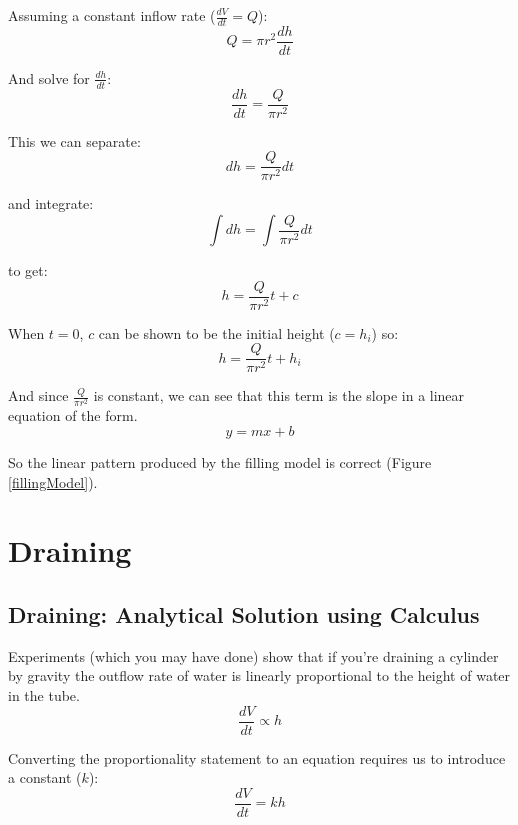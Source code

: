 \documentclass[11pt,fleqn]{article}
\begin{document}
	Assuming a constant inflow rate ($\frac{dV}{dt} = Q$):
	\begin{equation}
		Q = \pi r^2 \frac{dh}{dt} 
	\end{equation}

	And solve for $\frac{dh}{dt}$:
	\begin{equation}
		\frac{dh}{dt} = \frac{Q}{\pi r^2 }
	\end{equation}

	This we can separate:
	\begin{equation}
		dh = \frac{Q}{\pi r^2 } dt
	\end{equation}
	
	and integrate:
	\begin{equation}
		\int{dh} = \int{\frac{Q}{\pi r^2 } dt}
	\end{equation}

	to get:
	\begin{equation}
		h = \frac{Q}{\pi r^2 } t + c
	\end{equation}

	When $t=0$, $c$ can be shown to be the initial height ($c = h_i$) so:
	\begin{equation}
		h = \frac{Q}{\pi r^2 } t + h_i
	\end{equation}

	And since $\frac{Q}{\pi r^2}$ is constant, we can see that this term is the slope in a linear equation of the form.
	\begin{equation}
		y = mx + b
	\end{equation}

	So the linear pattern produced by the filling model is correct (Figure \ref{fillingModel}).


\section{Draining}

	\subsection{Draining: Analytical Solution using Calculus}
	Experiments (which you may have done) show that if you're draining a cylinder by gravity the outflow rate of water is linearly proportional to the height of water in the tube. 
	\begin{equation}
		\frac{dV}{dt} \propto h
	\end{equation}

	Converting the proportionality statement to an equation requires us to introduce a constant ($k$):
	\begin{equation}
		\label{DrainingDiffEqn}
		\frac{dV}{dt} = k h
	\end{equation}
\end{document}
